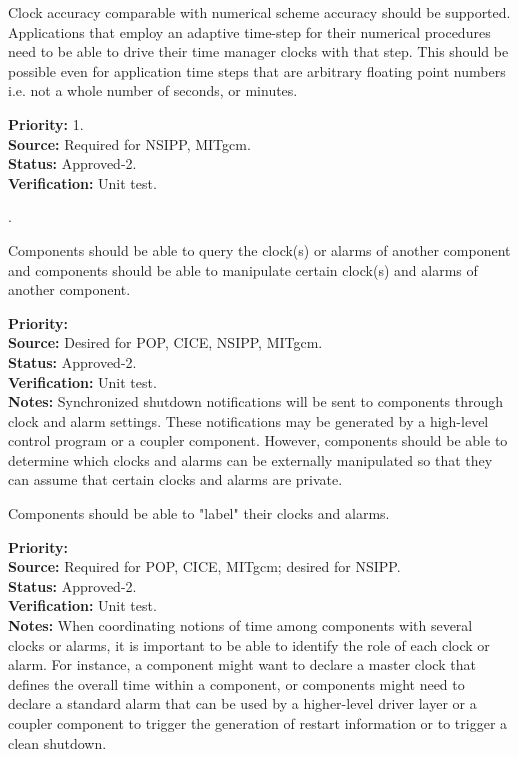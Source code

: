 Clock accuracy comparable with numerical scheme accuracy should be supported.
Applications that employ an adaptive time-step for their numerical
procedures need to be able to drive their time manager clocks with that step.
This should be possible even for application time steps that are arbitrary 
floating point numbers i.e. not a whole number of seconds, or minutes.
\begin{reqlist}
{\bf Priority:} 1. \\
{\bf Source:} Required for NSIPP, MITgcm. \\
{\bf Status:} Approved-2. \\
{\bf Verification:} Unit test. 
\end{reqlist}

\label{req:sharing}.

Components should be able to query the clock(s) or alarms of another
component and components should be able to manipulate certain clock(s) 
and alarms of another component.
\begin{reqlist}
{\bf Priority:} \\
{\bf Source:} Desired for POP, CICE, NSIPP, MITgcm. \\
{\bf Status:} Approved-2. \\
{\bf Verification:} Unit test. \\
{\bf Notes:}
Synchronized shutdown notifications will be sent to components through clock
and alarm settings. These notifications may be generated by a high-level control program
or a coupler component. However, components should be able to determine 
which clocks and alarms can be externally manipulated so that they can assume that
certain clocks and alarms are private.
\end{reqlist}

Components should be able to "label" their clocks and alarms.
\begin{reqlist}
{\bf Priority:} \\
{\bf Source:} Required for POP, CICE, MITgcm; desired for NSIPP. \\
{\bf Status:} Approved-2. \\
{\bf Verification:} Unit test. \\
{\bf Notes:}
When coordinating notions of time among components with several
clocks or alarms, it is important to be able to identify the role of 
each clock or alarm.
For instance, a component might want to declare a master clock that 
defines the overall time within a component, or components
might need to declare a standard alarm that can be used
by a higher-level driver layer or a coupler component to trigger 
the generation of restart information or to trigger a clean shutdown.
\end{reqlist}

